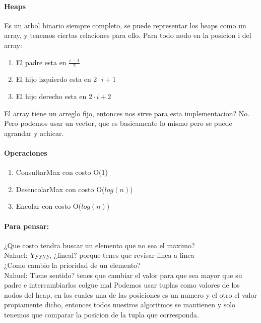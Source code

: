 \documentclass[a4paper,10pt]{article}
\begin{document}
\large
\paragraph*{Heaps} Es un arbol binario siempre completo, se puede representar los heaps como un array, y tenemos ciertas relaciones para ello.
\salto{\baselineskip}
Para todo nodo en la posicion i del array:
\begin{enumerate}
    \item El padre esta en $\frac{i-1}{2}$
    \item El hijo izquierdo esta en $2\cdot i +1$
    \item El hijo derecho esta en $2\cdot i + 2$
\end{enumerate}
El array tiene un arreglo fijo, entonces nos sirve para esta implementacion? No. Pero podemos usar un vector, que es basicamente lo mismo pero se puede agrandar y achicar.
\\\paragraph*{Operaciones}
\begin{enumerate}
    \item ConsultarMax con costo O(1)
    \item DesencolarMax con costo O($log(n)$)
    \item Encolar con costo O($log(n)$)
\end{enumerate}
\paragraph*{Para pensar:\\}
¿Que costo tendra buscar un elemento que no sea el maximo?
\\{\color{ForestGreen}Nahuel: Yyyyy, ¿lineal? porque tenes que revisar linea a linea}
\\¿Como cambio la prioridad de un elemento?
\\{\color{ForestGreen}Nahuel: Tiene sentido? tenes que cambiar el valor para que sea mayor que su padre e intercambiarlos}
\salto{\baselineskip}
{\LARGE colgue mal}
Podemos usar tuplas como valores de los nodos del heap, en los cuales una de las posiciones es un numero y el otro el valor propiamente dicho, entonces todos nuestros algoritmos se mantienen y solo tenemos que comparar la posicion de la tupla que corresponda.
\end{document}
